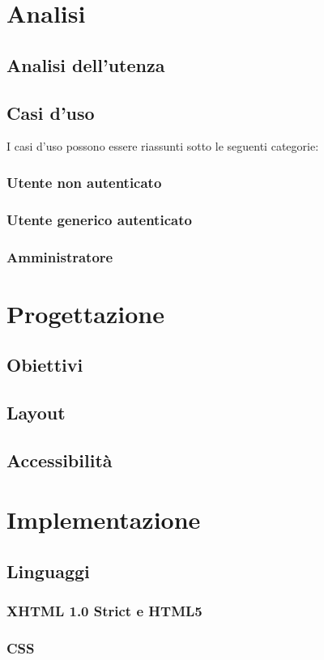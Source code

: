 \documentclass{article}
\begin{document}
	\section{Analisi}
		\subsection{Analisi dell'utenza}
		\subsection{Casi d'uso}
			I casi d'uso possono essere riassunti sotto le seguenti categorie:
			\subsubsection{Utente non autenticato}
			\subsubsection{Utente generico autenticato}
			\subsubsection{Amministratore}
	\section{Progettazione}
		\subsection{Obiettivi}
		\subsection{Layout}
		\subsection{Accessibilità}
	\section{Implementazione}
		\subsection{Linguaggi}
			\subsubsection{XHTML 1.0 Strict e HTML5}
			\subsubsection{CSS}
\end{document}
